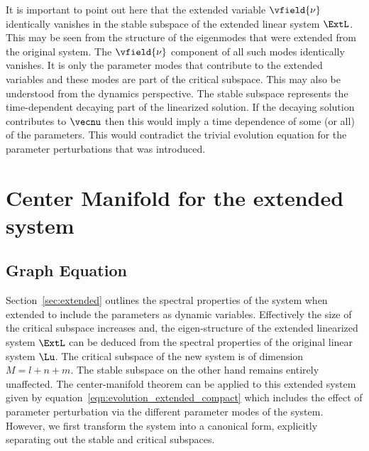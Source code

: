 It is important to point out here that the extended variable $\vfield{\nu}$ identically vanishes in the stable subspace of the extended linear system $\ExtL$. This may be seen from the structure of the eigenmodes that were extended from the original system. The $\vfield{\nu}$ component of all such modes identically vanishes. It is only the parameter modes that contribute to the extended variables and these modes are part of the critical subspace. This may also be understood from the dynamics perspective. The stable subspace represents the time-dependent decaying part of the linearized solution. If the decaying solution contributes to $\vecnu$ then this would imply a time dependence of some (or all) of the parameters. This would contradict the trivial evolution equation for the parameter perturbations that was introduced. 

\section{Center Manifold for the extended system}
\label{sec:center_manifold_derivation}

\subsection{Graph Equation}
\label{sec:graph_equation}

Section~\ref{sec:extended} outlines the spectral properties of the system when extended to include the parameters as dynamic variables. Effectively the size of the critical subspace increases and, the eigen-structure of the extended linearized system $\ExtL$ can be deduced from the spectral properties of the original linear system $\Lu$. The critical subspace of the new system is of dimension $M=l+n+m$. The stable subspace on the other hand remains entirely unaffected. The center-manifold theorem can be applied to this extended system given by equation~\eqref{eqn:evolution_extended_compact} which includes the effect of parameter perturbation via the different parameter modes of the system. However, we first transform the system into a canonical form, explicitly separating out the stable and critical subspaces. 

